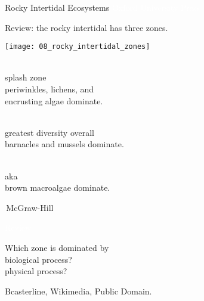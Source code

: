 \documentclass[t]{beamer}
\begin{document}

{
\begin{frame}[b]{Rocky Intertidal Ecosystems}
\tiny\textcolor{white}{\textcopyright Oxford University Press}
\end{frame}
}


\begin{frame}[t]{Review: the rocky intertidal has three zones.}

\vspace*{-\baselineskip}

\begin{multicols}{2}

	\begin{center}
		\texttt{[image: 08\_rocky\_intertidal\_zones]}
	\end{center}

\columnbreak

	\hangpara{}\\
	\hspace*{0.5em}splash zone\\
	\hspace*{0.5em}periwinkles, lichens, and\\
	\hspace*{0.5em}encrusting algae dominate.
	

	\hangpara{}\\
	\hspace*{0.5em}greatest diversity overall\\
	\hspace*{0.5em}barnacles and mussels dominate.

	\hangpara{}\\
	\hspace*{0.5em}aka \\
	\hspace*{0.5em}brown macroalgae dominate.

\end{multicols}

	\vfilll

	\tiny\textcopyright\,McGraw-Hill

\end{frame}
%
{
\begin{frame}[t]{\textcolor{white}{Review}}

	\hspace*{60mm}\hangpara Which zone is dominated by\\
	\hspace*{65mm} biological process?\\
	\hspace*{65mm} physical process?

	\vfilll
	\hfill\tiny Bcasterline, Wikimedia, Public Domain.
\end{frame}
}
\end{document}
